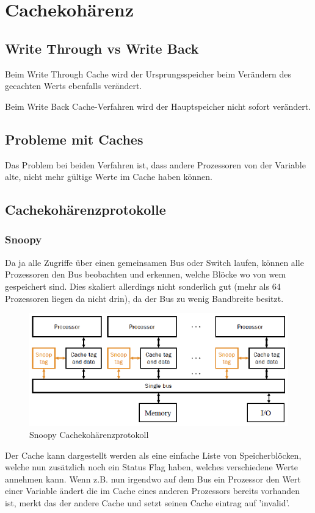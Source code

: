 \section{Cachekohärenz}
\subsection{Write Through vs Write Back}
Beim Write Through Cache wird der Ursprungsspeicher beim Verändern des gecachten Werts ebenfalls verändert.

Beim Write Back Cache-Verfahren wird der Hauptspeicher nicht sofort verändert. 
\subsection{Probleme mit Caches}
Das Problem bei beiden Verfahren ist, dass andere Prozessoren von der Variable alte, nicht mehr gültige Werte im Cache haben können.
\subsection{Cachekohärenzprotokolle}
\subsubsection{Snoopy}
Da ja alle Zugriffe über einen gemeinsamen Bus oder Switch laufen, können alle Prozessoren den Bus beobachten und erkennen, welche Blöcke wo von wem gespeichert sind. Dies skaliert allerdings nicht sonderlich gut (mehr als 64 Prozessoren liegen da nicht drin), da der Bus zu wenig Bandbreite besitzt.

\begin{figure}
\centering
\includegraphics[width=0.7\linewidth]{fig/snoopy}
\caption{Snoopy Cachekohärenzprotokoll}
\label{fig:snoopy}
\end{figure}

Der Cache kann dargestellt werden als eine einfache Liste von Speicherblöcken, welche nun zusätzlich noch ein Status Flag haben, welches verschiedene Werte annehmen kann. Wenn z.B. nun irgendwo auf dem Bus ein Prozessor den Wert einer Variable ändert die im Cache eines anderen Prozessors bereits vorhanden ist, merkt das der andere Cache und setzt seinen Cache eintrag auf 'invalid'.

